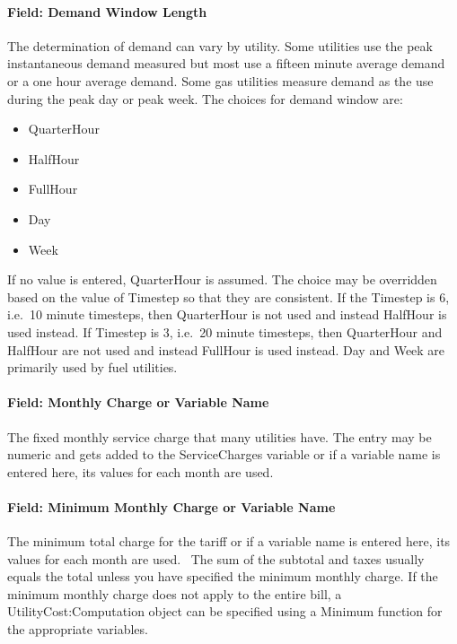 \paragraph{Field: Demand Window Length}\label{field-demand-window-length-000}

The determination of demand can vary by utility. Some utilities use the peak instantaneous demand measured but most use a fifteen minute average demand or a one hour average demand. Some gas utilities measure demand as the use during the peak day or peak week. The choices for demand window are:

\begin{itemize}
\item
  QuarterHour
\item
  HalfHour
\item
  FullHour
\item
  Day
\item
  Week
\end{itemize}

If no value is entered, QuarterHour is assumed. The choice may be overridden based on the value of Timestep so that they are consistent. If the Timestep is 6, i.e.~10 minute timesteps, then QuarterHour is not used and instead HalfHour is used instead. If Timestep is 3, i.e.~20 minute timesteps, then QuarterHour and HalfHour are not used and instead FullHour is used instead. Day and Week are primarily used by fuel utilities.

\paragraph{Field: Monthly Charge or Variable Name}\label{field-monthly-charge-or-variable-name}

The fixed monthly service charge that many utilities have. The entry may be numeric and gets added to the ServiceCharges variable or if a variable name is entered here, its values for each month are used.

\paragraph{Field: Minimum Monthly Charge or Variable Name}\label{field-minimum-monthly-charge-or-variable-name}

The minimum total charge for the tariff or if a variable name is entered here, its values for each month are used.~ The sum of the subtotal and taxes usually equals the total unless you have specified the minimum monthly charge. If the minimum monthly charge does not apply to the entire bill, a UtilityCost:Computation object can be specified using a Minimum function for the appropriate variables.

